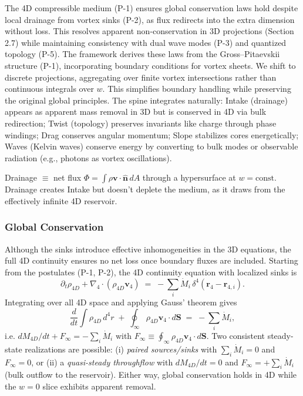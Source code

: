 The 4D compressible medium (P-1) ensures global conservation laws hold despite local drainage from vortex sinks (P-2), as flux redirects into the extra dimension without loss. This resolves apparent non-conservation in 3D projections (Section 2.7) while maintaining consistency with dual wave modes (P-3) and quantized topology (P-5). The framework derives these laws from the Gross–Pitaevskii structure (P-1), incorporating boundary conditions for vortex sheets. We shift to discrete projections, aggregating over finite vortex intersections rather than continuous integrals over $w$. This simplifies boundary handling while preserving the original global principles. The spine integrates naturally: Intake (drainage) appears as apparent mass removal in 3D but is conserved in 4D via bulk redirection; Twist (topology) preserves invariants like charge through phase windings; Drag conserves angular momentum; Slope stabilizes cores energetically; Waves (Kelvin waves) conserve energy by converting to bulk modes or observable radiation (e.g., photons as vortex oscillations).

Drainage $\equiv$ net flux $\Phi = \int \rho \mathbf{v} \cdot \hat{\mathbf{n}} \, dA$ through a hypersurface at $w = \text{const}$. Drainage creates Intake but doesn't deplete the medium, as it draws from the effectively infinite 4D reservoir.

\subsubsection{Global Conservation}
Although the sinks introduce effective inhomogeneities in the 3D equations, the full 4D continuity ensures no net loss once boundary fluxes are included. Starting from the postulates (P-1, P-2), the 4D continuity equation with localized sinks is
\begin{equation}
\partial_t \rho_{4D}+\nabla_4 \!\cdot (\rho_{4D}\mathbf{v}_4)\;=\;-\sum_i \dot{M}_i\,\delta^4(\mathbf{r}_4-\mathbf{r}_{4,i}).
\end{equation}
Integrating over all 4D space and applying Gauss' theorem gives
\begin{equation}
\frac{d}{dt}\!\int \rho_{4D}\,d^4 r\;+\;\oint_{\infty}\rho_{4D}\mathbf{v}_4\!\cdot d\mathbf{S}\;=\;-\sum_i \dot M_i,
\end{equation}
i.e. $dM_{4D}/dt+F_\infty=-\sum_i\dot M_i$ with $F_\infty\equiv\oint_{\infty}\rho_{4D}\mathbf{v}_4\!\cdot d\mathbf{S}$. Two consistent steady-state realizations are possible: (i) \emph{paired sources/sinks} with $\sum_i \dot M_i=0$ and $F_\infty=0$, or (ii) a \emph{quasi-steady throughflow} with $dM_{4D}/dt=0$ and $F_\infty=+\sum_i \dot M_i$ (bulk outflow to the reservoir). Either way, global conservation holds in 4D while the $w=0$ slice exhibits apparent removal.

